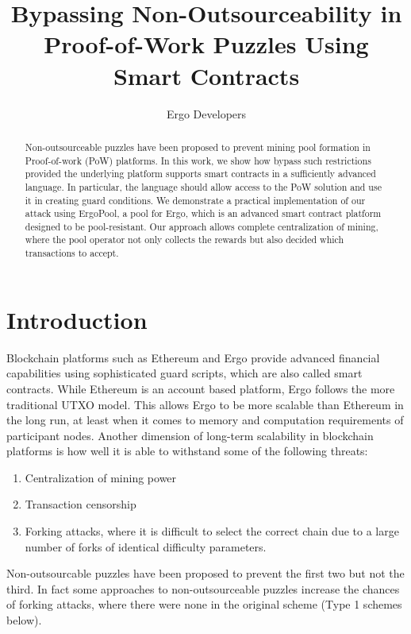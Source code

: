 \documentclass[11pt]{article}
\newcommand{\authnote}[2]{\marginpar{\parbox{\marginparwidth}{\tiny %
  \textsf{#1 {\textcolor{blue}{notes: #2}}}}}%
  \textcolor{blue}{\textbf{\dag}}}
\newcommand{\authnote}[2]{
  \textsf{#1 \textcolor{blue}{: #2}}}
\newcommand{\authnote}[2]{}
\newcommand{\snote}[1]{{\authnote{\textcolor{yellow}{Scalahub notes}}{#1}}}
\newcommand{\poolname}{ErgoPool\xspace}
\begin{document}
\title{Bypassing Non-Outsourceability in Proof-of-Work Puzzles Using Smart Contracts}
\author{Ergo Developers}
\maketitle

\begin{abstract}
	Non-outsourceable puzzles have been proposed to prevent mining pool formation in Proof-of-work (PoW) platforms. In this work, we show how bypass such restrictions provided the underlying platform supports smart contracts in a sufficiently advanced language. In particular, the language should allow access to the PoW solution and use it in creating guard conditions. We demonstrate a practical implementation of our attack using \poolname, a pool for Ergo, which is an advanced smart contract platform designed to be pool-resistant. Our approach allows complete centralization of mining, where the pool operator not only collects the rewards but also decided which transactions to accept. 
	
\end{abstract}

\section{Introduction}
\snote{Below text copied from PoW intro paper}

Blockchain platforms such as Ethereum and Ergo provide advanced financial capabilities using sophisticated guard scripts, which are also called smart contracts. While Ethereum is an account based platform, Ergo follows the more traditional UTXO model. This allows Ergo to be more scalable than Ethereum in the long run, at least when it comes to memory and computation requirements of participant nodes. 
Another dimension of long-term scalability in blockchain platforms is how well it is able to withstand some of the following threats:
\begin{enumerate}
    \item Centralization of mining power
    \item Transaction censorship
    \item Forking attacks, where it is difficult to select the correct chain due to a large number of forks of identical difficulty parameters.
\end{enumerate}

Non-outsourcable puzzles have been proposed to prevent the first two but not the third. In fact some approaches to non-outsourceable puzzles increase the chances of forking attacks, where there were none in the original scheme (Type 1 schemes below). 
\end{document}
